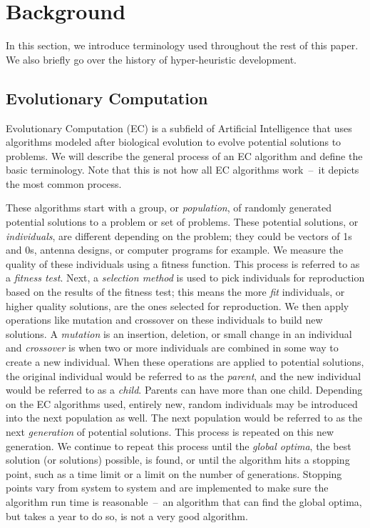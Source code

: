 \documentclass{sig-alternate}
\begin{document}
\section{Background}
\label{sec:background}
In this section, we introduce terminology used throughout the rest of this paper. We also briefly go over the history of hyper-heuristic development.

\subsection{Evolutionary Computation}
\label{sec:evocomp}
Evolutionary Computation (EC) is a subfield of Artificial Intelligence that uses algorithms modeled after biological evolution to evolve potential solutions to problems. We will describe the general process of an EC algorithm and define the basic terminology. Note that this is not how all EC algorithms work~--~it depicts the most common process.

These algorithms start with a group, or \textit{population}, of randomly generated potential solutions to a problem or set of problems. These potential solutions, or \textit{individuals}, are different depending on the problem; they could be vectors of 1s and 0s, antenna designs, or computer programs for example. We measure the quality of these individuals using a fitness function. This process is referred to as a \textit{fitness test}. Next, a \textit{selection method} is used to pick individuals for reproduction based on the results of the fitness test; this means the more \textit{fit} individuals, or higher quality solutions, are the ones selected for reproduction. We then apply operations like mutation and crossover on these individuals to build new solutions. A \textit{mutation} is an insertion, deletion, or small change in an individual and \textit{crossover} is when two or more individuals are combined in some way to create a new individual. When these operations are applied to potential solutions, the original individual would be referred to as the \textit{parent}, and the new individual would be referred to as a \textit{child}. Parents can have more than one child. Depending on the EC algorithms used, entirely new, random individuals may be introduced into the next population as well. The next population would be referred to as the next \textit{generation} of potential solutions. This process is repeated on this new generation. We continue to repeat this process until the \textit{global optima}, the best solution (or solutions) possible, is found, or until the algorithm hits a stopping point, such as a time limit or a limit on the number of generations. Stopping points vary from system to system and are implemented to make sure the algorithm run time is reasonable~--~an algorithm that can find the global optima, but takes a year to do so, is not a very good algorithm.
\end{document}
